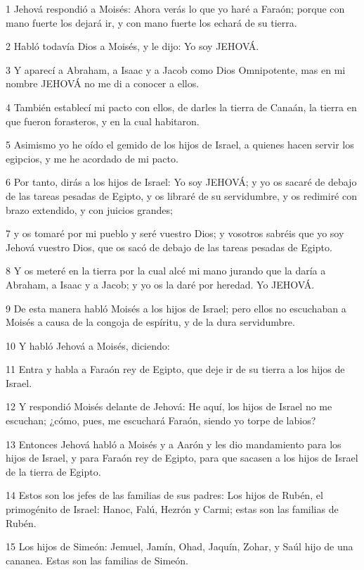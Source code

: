 \par 1 Jehová respondió a Moisés: Ahora verás lo que yo haré a Faraón; porque con mano fuerte los dejará ir, y con mano fuerte los echará de su tierra.
\par 2 Habló todavía Dios a Moisés, y le dijo: Yo soy JEHOVÁ.
\par 3 Y aparecí a Abraham, a Isaac y a Jacob como Dios Omnipotente, mas en mi nombre JEHOVÁ no me di a conocer a ellos.
\par 4 También establecí mi pacto con ellos, de darles la tierra de Canaán, la tierra en que fueron forasteros, y en la cual habitaron.
\par 5 Asimismo yo he oído el gemido de los hijos de Israel, a quienes hacen servir los egipcios, y me he acordado de mi pacto.
\par 6 Por tanto, dirás a los hijos de Israel: Yo soy JEHOVÁ; y yo os sacaré de debajo de las tareas pesadas de Egipto, y os libraré de su servidumbre, y os redimiré con brazo extendido, y con juicios grandes;
\par 7 y os tomaré por mi pueblo y seré vuestro Dios; y vosotros sabréis que yo soy Jehová vuestro Dios, que os sacó de debajo de las tareas pesadas de Egipto.
\par 8 Y os meteré en la tierra por la cual alcé mi mano jurando que la daría a Abraham, a Isaac y a Jacob; y yo os la daré por heredad. Yo JEHOVÁ.
\par 9 De esta manera habló Moisés a los hijos de Israel; pero ellos no escuchaban a Moisés a causa de la congoja de espíritu, y de la dura servidumbre.
\par 10 Y habló Jehová a Moisés, diciendo:
\par 11 Entra y habla a Faraón rey de Egipto, que deje ir de su tierra a los hijos de Israel.
\par 12 Y respondió Moisés delante de Jehová: He aquí, los hijos de Israel no me escuchan; ¿cómo, pues, me escuchará Faraón, siendo yo torpe de labios?
\par 13 Entonces Jehová habló a Moisés y a Aarón y les dio mandamiento para los hijos de Israel, y para Faraón rey de Egipto, para que sacasen a los hijos de Israel de la tierra de Egipto.
\par 14 Estos son los jefes de las familias de sus padres: Los hijos de Rubén, el primogénito de Israel: Hanoc, Falú, Hezrón y Carmi; estas son las familias de Rubén.
\par 15 Los hijos de Simeón: Jemuel, Jamín, Ohad, Jaquín, Zohar, y Saúl hijo de una cananea. Estas son las familias de Simeón.

